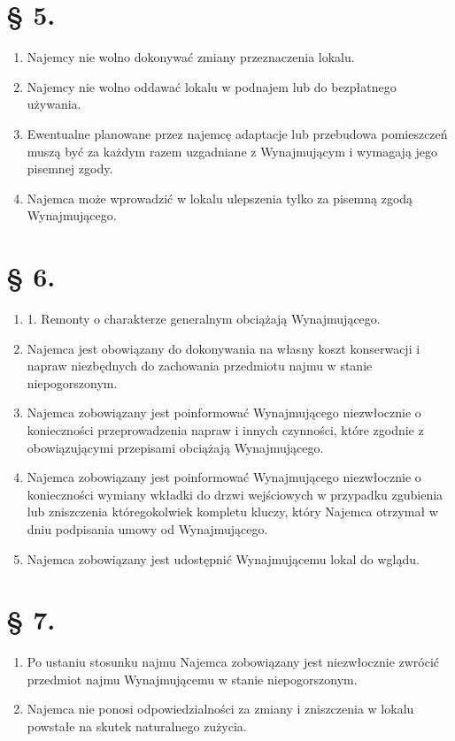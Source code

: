\documentclass[a4paper,11pt, notitlepage]{article}
\begin{document}
\section*{§ 5.}
    \begin{enumerate}
        \item Najemcy nie wolno dokonywać zmiany przeznaczenia lokalu.
 	
        \item Najemcy nie wolno oddawać lokalu w podnajem lub do bezpłatnego używania.
 	
        \item Ewentualne planowane przez najemcę adaptacje lub przebudowa pomieszczeń muszą 	być za każdym razem uzgadniane z Wynajmującym i wymagają jego 	pisemnej zgody.
 	
        \item Najemca może wprowadzić w lokalu ulepszenia tylko za pisemną zgodą Wynajmującego.
    \end{enumerate}

    
\section*{§ 6.}
    \begin{enumerate}
        \item 1. Remonty o charakterze generalnym obciążają Wynajmującego.
 	
        \item Najemca jest obowiązany do dokonywania na własny koszt konserwacji i napraw niezbędnych do zachowania przedmiotu najmu w stanie niepogorszonym.
 	
        \item Najemca zobowiązany jest poinformować Wynajmującego niezwłocznie o konieczności przeprowadzenia napraw i innych czynności, które zgodnie z obowiązującymi przepisami obciążają Wynajmującego.
 	
        \item Najemca zobowiązany jest poinformować Wynajmującego niezwłocznie o konieczności wymiany wkładki do drzwi wejściowych w przypadku 	zgubienia lub zniszczenia któregokolwiek kompletu kluczy, który Najemca otrzymał w dniu podpisania umowy od Wynajmującego.
 	
        \item Najemca zobowiązany jest udostępnić Wynajmującemu lokal do wglądu.
\end{enumerate}

    
\section*{§ 7.}
    \begin{enumerate}
        \item Po ustaniu stosunku najmu Najemca zobowiązany jest niezwłocznie zwrócić przedmiot najmu Wynajmującemu w stanie niepogorszonym.
 	
        \item Najemca nie ponosi odpowiedzialności za zmiany i zniszczenia w 	lokalu powstałe na skutek naturalnego zużycia.
    \end{enumerate}
\end{document}
